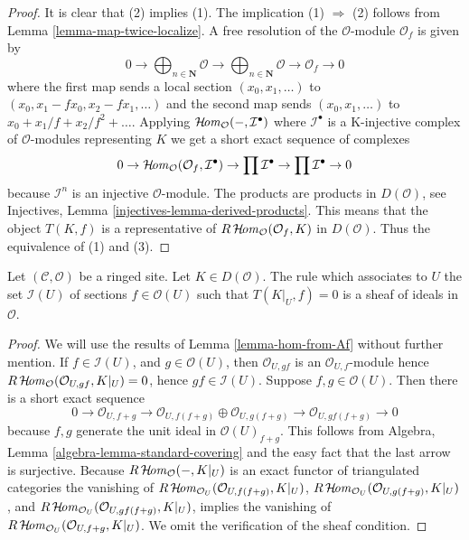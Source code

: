 \begin{proof}
It is clear that (2) implies (1). The implication (1) $\Rightarrow$ (2)
follows from Lemma \ref{lemma-map-twice-localize}.
A free resolution of the $\mathcal{O}$-module $\mathcal{O}_f$ is given by
$$
0 \to \bigoplus\nolimits_{n \in \mathbf{N}} \mathcal{O} \to
\bigoplus\nolimits_{n \in \mathbf{N}} \mathcal{O}
\to \mathcal{O}_f \to 0
$$
where the first map sends a local section $(x_0, x_1, \ldots)$ to
$(x_0, x_1 - fx_0, x_2 - fx_1, \ldots)$ and the second map sends
$(x_0, x_1, \ldots)$ to $x_0 + x_1/f + x_2/f^2 + \ldots$.
Applying $\mathop{\mathcal{H}\!\mathit{om}}\nolimits_\mathcal{O}(-, \mathcal{I}^\bullet)$
where $\mathcal{I}^\bullet$ is a K-injective complex of $\mathcal{O}$-modules
representing $K$ we get a short exact sequence of complexes
$$
0 \to \mathop{\mathcal{H}\!\mathit{om}}\nolimits_\mathcal{O}(\mathcal{O}_f, \mathcal{I}^\bullet) \to
\prod \mathcal{I}^\bullet \to \prod \mathcal{I}^\bullet \to 0
$$
because $\mathcal{I}^n$ is an injective $\mathcal{O}$-module.
The products are products in $D(\mathcal{O})$, see
Injectives, Lemma \ref{injectives-lemma-derived-products}.
This means that the object $T(K, f)$ is a representative of
$R\mathop{\mathcal{H}\!\mathit{om}}\nolimits_\mathcal{O}(\mathcal{O}_f, K)$ in $D(\mathcal{O})$.
Thus the equivalence of (1) and (3).
\end{proof}

\begin{lemma}
\label{lemma-ideal-of-elements-complete-wrt}
Let $(\mathcal{C}, \mathcal{O})$ be a ringed site. Let $K \in D(\mathcal{O})$.
The rule which associates to $U$ the set $\mathcal{I}(U)$
of sections $f \in \mathcal{O}(U)$ such that $T(K|_U, f) = 0$
is a sheaf of ideals in $\mathcal{O}$.
\end{lemma}

\begin{proof}
We will use the results of Lemma \ref{lemma-hom-from-Af} without further
mention. If $f \in \mathcal{I}(U)$, and $g \in \mathcal{O}(U)$, then
$\mathcal{O}_{U, gf}$ is an $\mathcal{O}_{U, f}$-module
hence $R\mathop{\mathcal{H}\!\mathit{om}}\nolimits_\mathcal{O}(\mathcal{O}_{U, gf}, K|_U) = 0$, hence
$gf \in \mathcal{I}(U)$. Suppose $f, g \in \mathcal{O}(U)$.
Then there is a short exact sequence
$$
0 \to \mathcal{O}_{U, f + g} \to
\mathcal{O}_{U, f(f + g)} \oplus \mathcal{O}_{U, g(f + g)} \to
\mathcal{O}_{U, gf(f + g)} \to 0
$$
because $f, g$ generate the unit ideal in $\mathcal{O}(U)_{f + g}$.
This follows from
Algebra, Lemma \ref{algebra-lemma-standard-covering}
and the easy fact that the last arrow is surjective.
Because $R\mathop{\mathcal{H}\!\mathit{om}}\nolimits_\mathcal{O}( - , K|_U)$ is an exact functor
of triangulated categories the vanishing of
$R\mathop{\mathcal{H}\!\mathit{om}}\nolimits_{\mathcal{O}_U}(\mathcal{O}_{U, f(f + g)}, K|_U)$,
$R\mathop{\mathcal{H}\!\mathit{om}}\nolimits_{\mathcal{O}_U}(\mathcal{O}_{U, g(f + g)}, K|_U)$, and
$R\mathop{\mathcal{H}\!\mathit{om}}\nolimits_{\mathcal{O}_U}(\mathcal{O}_{U, gf(f + g)}, K|_U)$,
implies the vanishing of 
$R\mathop{\mathcal{H}\!\mathit{om}}\nolimits_{\mathcal{O}_U}(\mathcal{O}_{U, f + g}, K|_U)$.
We omit the verification of the sheaf condition.
\end{proof}

